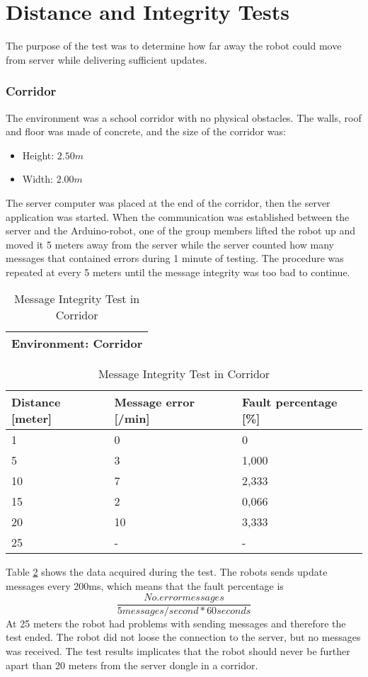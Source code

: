 \newpage
\section{Distance and Integrity Tests}
\label{sec:testcom}
The purpose of the test was to determine how far away the robot could move from server while delivering sufficient updates.
\subsubsection{Corridor}
The environment was a school corridor with no physical obstacles. The walls, roof and floor was made of concrete, and the size of the corridor was:
\begin{itemize}
    \item Height: $2.50 m$
    \item Width: $2.00 m$
\end{itemize}
The server computer was placed at the end of the corridor, then the server application was started. When the communication was established between the server and the Arduino-robot, one of the group members lifted the robot up and moved it 5 meters away from the server while the server counted how many messages that contained errors during 1 minute of testing. The procedure was repeated at every 5 meters until the message integrity was too bad to continue.
\newpage
{}

\begin{table}[ht]
\begin{center}
 \begin{tabular}{|p{100pt}|} 
 \hline
 Environment: \textbf{Corridor}\\
 \hline
 \end{tabular}
 \begin{tabular}{|p{90pt}|p{100pt}|p{90pt}|}
 \hline
 Distance [meter] & Message error [/min] &  Fault percentage [\%]\\
 \hline
 1		        &   0 		&	0    \\
 5              &   3  		&	1,000\\
 10             &   7  		&	2,333\\
 15				&	2 		&	0,066\\
 20				&	10 		&	3,333\\
 25				&	-		&	-    \\
 \hline
\end{tabular}
\end{center}
\caption{Message Integrity Test in Corridor}
\label{tab:messintegritycorr}
\end{table}
Table \ref{tab:messintegritycorr} shows the data acquired during the test. The robots sends update messages every 200ms, which means that the fault percentage is $$\frac{No. error messages}{5 messages/second * 60 seconds}$$
At 25 meters the robot had problems with sending messages and therefore the test ended. The robot did not loose the connection to the server, but no messages was received. The test results implicates that the robot should never be further apart than 20 meters from the server dongle in a corridor.

